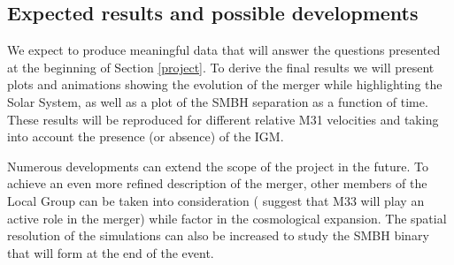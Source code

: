 \documentclass[10pt,english]{article}
\begin{document}
\subsection{Expected results and possible developments}
\label{expected-results}
We expect to produce meaningful data that will answer the questions presented at the beginning of Section \ref{project}. To derive the final results we will present plots and animations showing the evolution of the merger while highlighting the Solar System, as well as a plot of the SMBH separation as a function of time. These results will be reproduced for different relative M31 velocities and taking into account the presence (or absence) of the IGM.\par
\smallskip
Numerous developments can extend the scope of the project in the future. To achieve an even more refined description of the merger, other members of the Local Group can be taken into consideration (\textcite{van_der_Marel_2012b} suggest that M33 will play an active role in the merger) while factor in the cosmological expansion. The spatial resolution of the simulations can also be increased to study the SMBH binary that will form at the end of the event.\par

\setlength{}
\printbibliography[heading=bibintoc,title={References}]
\end{document}
